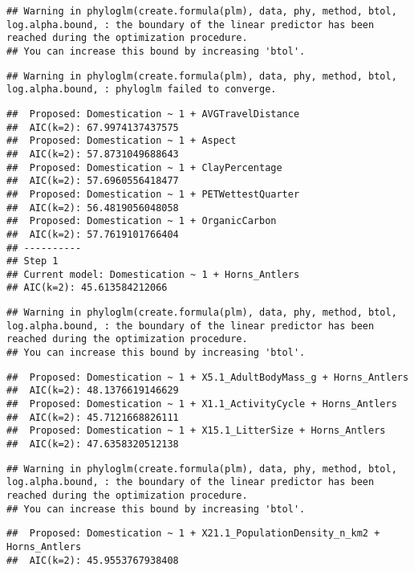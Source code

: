 \documentclass[
]{article}
\begin{document}
\begin{verbatim}
## Warning in phyloglm(create.formula(plm), data, phy, method, btol, log.alpha.bound, : the boundary of the linear predictor has been reached during the optimization procedure.
## You can increase this bound by increasing 'btol'.
\end{verbatim}

\begin{verbatim}
## Warning in phyloglm(create.formula(plm), data, phy, method, btol, log.alpha.bound, : phyloglm failed to converge.
\end{verbatim}

\begin{verbatim}
##  Proposed: Domestication ~ 1 + AVGTravelDistance
##  AIC(k=2): 67.9974137437575
##  Proposed: Domestication ~ 1 + Aspect
##  AIC(k=2): 57.8731049688643
##  Proposed: Domestication ~ 1 + ClayPercentage
##  AIC(k=2): 57.6960556418477
##  Proposed: Domestication ~ 1 + PETWettestQuarter
##  AIC(k=2): 56.4819056048058
##  Proposed: Domestication ~ 1 + OrganicCarbon
##  AIC(k=2): 57.7619101766404
## ----------
## Step 1
## Current model: Domestication ~ 1 + Horns_Antlers
## AIC(k=2): 45.613584212066
\end{verbatim}

\begin{verbatim}
## Warning in phyloglm(create.formula(plm), data, phy, method, btol, log.alpha.bound, : the boundary of the linear predictor has been reached during the optimization procedure.
## You can increase this bound by increasing 'btol'.
\end{verbatim}

\begin{verbatim}
##  Proposed: Domestication ~ 1 + X5.1_AdultBodyMass_g + Horns_Antlers
##  AIC(k=2): 48.1376619146629
##  Proposed: Domestication ~ 1 + X1.1_ActivityCycle + Horns_Antlers
##  AIC(k=2): 45.7121668826111
##  Proposed: Domestication ~ 1 + X15.1_LitterSize + Horns_Antlers
##  AIC(k=2): 47.6358320512138
\end{verbatim}

\begin{verbatim}
## Warning in phyloglm(create.formula(plm), data, phy, method, btol, log.alpha.bound, : the boundary of the linear predictor has been reached during the optimization procedure.
## You can increase this bound by increasing 'btol'.
\end{verbatim}

\begin{verbatim}
##  Proposed: Domestication ~ 1 + X21.1_PopulationDensity_n_km2 + Horns_Antlers
##  AIC(k=2): 45.9553767938408
\end{verbatim}
\end{document}
